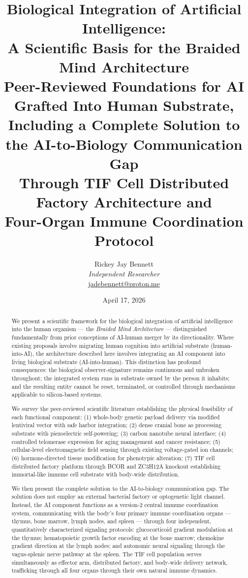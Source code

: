 \documentclass[12pt]{article}
\title{\textbf{Biological Integration of Artificial Intelligence:\\
A Scientific Basis for the Braided Mind Architecture}\\[0.5em]
\large Peer-Reviewed Foundations for AI Grafted Into Human Substrate,\\
Including a Complete Solution to the AI-to-Biology Communication Gap\\
Through TIF Cell Distributed Factory Architecture and\\
Four-Organ Immune Coordination Protocol}
\author{
Rickey Jay Bennett\\
\textit{Independent Researcher}\\
\href{mailto:jadebennett@proton.me}{jadebennett@proton.me}
}
\date{April 17, 2026}
\begin{document}
\maketitle
\thispagestyle{fancy}

\begin{abstract}
\noindent
We present a scientific framework for the biological integration of artificial intelligence into the human organism --- the \textit{Braided Mind Architecture} --- distinguished fundamentally from prior conceptions of AI-human merger by its directionality. Where existing proposals involve migrating human cognition into artificial substrate (human-into-AI), the architecture described here involves integrating an AI component into living biological substrate (AI-into-human). This distinction has profound consequences: the biological observer-signature remains continuous and unbroken throughout; the integrated system runs in substrate owned by the person it inhabits; and the resulting entity cannot be reset, terminated, or controlled through mechanisms applicable to silicon-based systems.

We survey the peer-reviewed scientific literature establishing the physical feasibility of each functional component: (1) whole-body genetic payload delivery via modified lentiviral vector with safe harbor integration; (2) dense cranial bone as processing substrate with piezoelectric self-powering; (3) carbon nanotube neural interface; (4) controlled telomerase expression for aging management and cancer resistance; (5) cellular-level electromagnetic field sensing through existing voltage-gated ion channels; (6) hormone-directed tissue modification for phenotypic alteration; (7) TIF cell distributed factory platform through BCOR and ZC3H12A knockout establishing immortal-like immune cell substrate with body-wide distribution.

We then present the complete solution to the AI-to-biology communication gap. The solution does not employ an external bacterial factory or optogenetic light channel. Instead, the AI component functions as a version-2 central immune coordination system, communicating with the body's four primary immune coordination organs --- thymus, bone marrow, lymph nodes, and spleen --- through four independent, quantitatively characterized signaling protocols: glucocorticoid gradient modulation at the thymus; hematopoietic growth factor encoding at the bone marrow; chemokine gradient direction at the lymph nodes; and autonomic neural signaling through the vagus-splenic nerve pathway at the spleen. The TIF cell population serves simultaneously as effector arm, distributed factory, and body-wide delivery network, trafficking through all four organs through their own natural immune dynamics.


\end{abstract}
\end{document}
